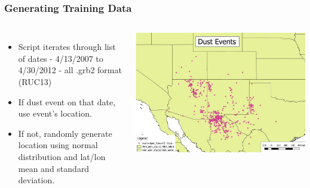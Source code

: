 \documentclass{beamer}
\begin{document}
\begin{frame}
	\frametitle{Generating Training Data}
	\begin{columns}
		\begin{itemize}
			\item
				Script iterates through list of dates - 4/13/2007 to 4/30/2012 - all .grb2 format (RUC13)
			\item
				If dust event on that date, use event's location.
			\item
				If not, randomly generate location using normal distribution and lat/lon mean and standard deviation.

		\end{itemize}
		\includegraphics[width=\textwidth]{images/dustevents.jpg}
	\end{columns}
\end{frame}
\end{document}
